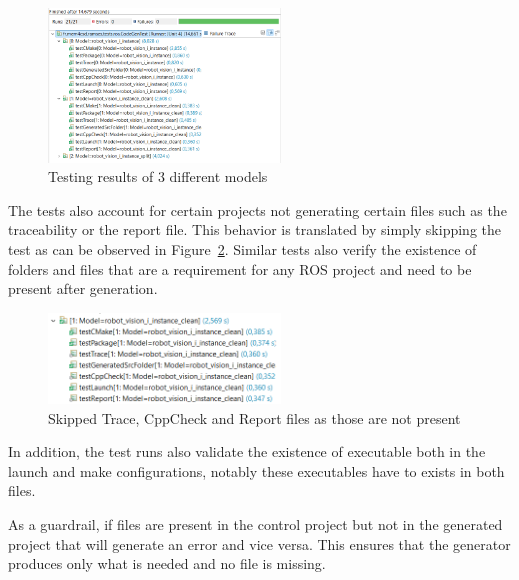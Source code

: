 \begin{figure}[htbp]
	\centering
	\includegraphics[width=0.55\textwidth]{testingResults1.png}
	\caption{Testing results of 3 different models}
	\label{fig:testingResults1}
\end{figure}

The tests also account for certain projects not generating certain files such as the traceability or the report file. This behavior is translated by simply skipping the test as can be observed in Figure~\ref{fig:testingResultsSkip1}. Similar tests also verify the existence of folders and files that are a requirement for any \gls{ROS} project and need to be present after generation.

\begin{figure}[htbp]
	\centering
	\includegraphics[width=0.55\textwidth]{testingResultsSkip1.png}
	\caption{Skipped Trace, CppCheck and Report files as those are not present}
	\label{fig:testingResultsSkip1}
\end{figure}

In addition, the test runs also validate the existence of executable both in the launch and make configurations, notably these executables have to exists in both files. 

As a guardrail, if files are present in the control project but not in the generated project that will generate an error and vice versa. This ensures that the generator produces only what is needed and no file is missing.

